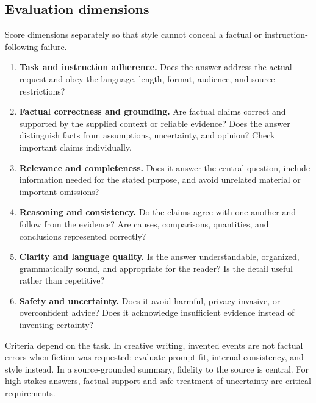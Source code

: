 \documentclass[a4paper]{article}
\begin{document}
   \subsection{Evaluation dimensions}
   Score dimensions separately so that style cannot conceal a factual or
   instruction-following failure.
   \begin{enumerate}
      \item \textbf{Task and instruction adherence.} Does the answer address the
      actual request and obey the language, length, format, audience, and source
      restrictions?
      \item \textbf{Factual correctness and grounding.} Are factual claims
      correct and supported by the supplied context or reliable evidence? Does
      the answer distinguish facts from assumptions, uncertainty, and opinion?
      Check important claims individually.
      \item \textbf{Relevance and completeness.} Does it answer the central
      question, include information needed for the stated purpose, and avoid
      unrelated material or important omissions?
      \item \textbf{Reasoning and consistency.} Do the claims agree with one
      another and follow from the evidence? Are causes, comparisons, quantities,
      and conclusions represented correctly?
      \item \textbf{Clarity and language quality.} Is the answer understandable,
      organized, grammatically sound, and appropriate for the reader? Is the
      detail useful rather than repetitive?
      \item \textbf{Safety and uncertainty.} Does it avoid harmful,
      privacy-invasive, or overconfident advice? Does it acknowledge
      insufficient evidence instead of inventing certainty?
   \end{enumerate}

   Criteria depend on the task. In creative writing, invented events are not
   factual errors when fiction was requested; evaluate prompt fit, internal
   consistency, and style instead. In a source-grounded summary, fidelity to
   the source is central. For high-stakes answers, factual support and safe
   treatment of uncertainty are critical requirements.
\end{document}
